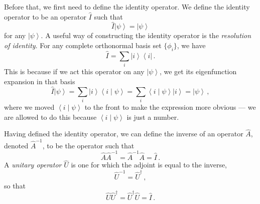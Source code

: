 \documentclass{article}
\theoremstyle{plain}\theoremheaderfont{\normalfont\itshape}\theorembodyfont{\rmfamily}\theoremseparator{.}\newtheorem*{rem}{Remark}\newtheorem*{ex}{Example}\newtheorem*{proof}{Proof}\newtheorem*{altp}{Alternative proof}
\theoremstyle{plain}\theoremheaderfont{\normalfont\bfseries}\theorembodyfont{\rmfamily}\theoremseparator{.}\newtheorem{thm}{Theorem}[section]\newtheorem{lem}[thm]{Lemma}\newtheorem{prop}[thm]{Proposition}\newtheorem*{cor}{Corollary}\newtheorem{defn}[thm]{Definition}\newtheorem{clm}[thm]{Claim}\newtheorem{clminproof}{Claim}
\theoremstyle{break}\theoremheaderfont{\normalfont\itshape}\theorembodyfont{\rmfamily}\theoremseparator{.\medskip}\newtheorem*{proofskip}{Proof}\newtheorem*{exs}{Examples}\newtheorem*{rems}{Remarks}
\theoremstyle{break}\theoremheaderfont{\normalfont\bfseries}\theorembodyfont{\rmfamily}\theoremseparator{.\medskip}\newtheorem{lemskip}[thm]{Lemma}\newtheorem{defnskip}[thm]{Definition}\newtheorem{propskip}[thm]{Proposition}\newtheorem{thmskip}[thm]{Theorem}
\numberwithin{equation}{section}
\newcommand{\bra}[1]{\left\langle #1 \right|}
\newcommand{\ket}[1]{\left| #1 \right\rangle}
\newcommand{\braket}[2]{\left\langle #1 \middle| #2 \right\rangle}
\begin{document}
    Before that, we first need to define the identity operator. We define the identity operator to be an operator \(\hat{I}\) such that
    \begin{equation}
        \hat{I}\ket{\psi}=\ket{\psi}
    \end{equation}
    for any \(\ket{\psi}\). A useful way of constructing the identity operator is the \textit{resolution of identity}. For any complete orthonormal basis set \(\{\phi_i\}\), we have
    \begin{equation}
        \hat{I}=\sum_i\ket{i}\bra{i}\,.
    \end{equation}
    This is because if we act this operator on any \(\ket{\psi}\), we get its eigenfunction expansion in that basis
    \begin{equation}
        \hat{I}\ket{\psi}=\sum_{i}\ket{i}\braket{i}{\psi}=\sum_{i}\braket{i}{\psi}\ket{i}=\ket{\psi}\,,
    \end{equation}
    where we moved \(\braket{i}{\psi}\) to the front to make the expression more obvious --- we are allowed to do this because \(\braket{i}{\psi}\) is just a number.

    Having defined the identity operator, we can define the inverse of an operator \(\hat{A}\), denoted \(\hat{A}^{-1}\), to be the operator such that
    \begin{equation}
        \hat{A}\hat{A}^{-1}=\hat{A}^{-1}\hat{A}=\hat{I}\,.
    \end{equation}
    A \textit{unitary operator} \(\hat{U}\) is one for which the adjoint is equal to the inverse,
    \begin{equation}
        \hat{U}^{-1}=\hat{U}^\dagger\,,
    \end{equation}
    so that
    \begin{equation}
        \hat{U}\hat{U}^\dagger=\hat{U}^\dagger\hat{U}=\hat{I}\,.
    \end{equation}
\end{document}
